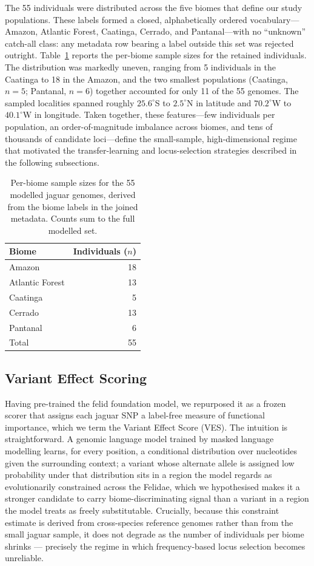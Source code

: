 \documentclass[twocolumn,10pt]{article}
\begin{document}
The 55 individuals were distributed across the five biomes that define our study populations. These
labels formed a closed, alphabetically ordered vocabulary---Amazon, Atlantic Forest, Caatinga,
Cerrado, and Pantanal---with no ``unknown'' catch-all class: any metadata row bearing a label
outside this set was rejected outright. Table~\ref{tab:jaguar-biome-counts} reports the per-biome
sample sizes for the retained individuals. The distribution was markedly uneven, ranging from 5
individuals in the Caatinga to 18 in the Amazon, and the two smallest populations (Caatinga, $n=5$;
Pantanal, $n=6$) together accounted for only 11 of the 55 genomes. The sampled localities spanned
roughly $25.6^{\circ}$S to $2.5^{\circ}$N in latitude and $70.2^{\circ}$W to $40.1^{\circ}$W in
longitude. Taken together, these features---few individuals per population, an order-of-magnitude
imbalance across biomes, and tens of thousands of candidate loci---define the small-sample,
high-dimensional regime that motivated the transfer-learning and locus-selection strategies
described in the following subsections.

\begin{table}[t]
\centering
\caption{Per-biome sample sizes for the 55 modelled jaguar genomes, derived from the biome labels in
the joined metadata. Counts sum to the full modelled set.}
\label{tab:jaguar-biome-counts}
\begin{tabular}{lr}
\toprule
Biome & Individuals ($n$) \\
\midrule
Amazon & 18 \\
Atlantic Forest & 13 \\
Caatinga & 5 \\
Cerrado & 13 \\
Pantanal & 6 \\
\midrule
Total & 55 \\
\bottomrule
\end{tabular}
\end{table}

\subsection{Variant Effect Scoring}
Having pre-trained the felid foundation model, we repurposed it as a frozen scorer that assigns each
jaguar SNP a label-free measure of functional importance, which we term the Variant Effect Score
(VES). The intuition is straightforward. A genomic language model trained by masked language
modelling learns, for every position, a conditional distribution over nucleotides given the
surrounding context; a variant whose alternate allele is assigned low probability under that
distribution sits in a region the model regards as evolutionarily constrained across the Felidae,
which we hypothesised makes it a stronger candidate to carry biome-discriminating signal than a
variant in a region the model treats as freely substitutable. Crucially, because this constraint
estimate is derived from cross-species reference genomes rather than from the small jaguar sample,
it does not degrade as the number of individuals per biome shrinks --- precisely the regime in which
frequency-based locus selection becomes unreliable.
\end{document}
